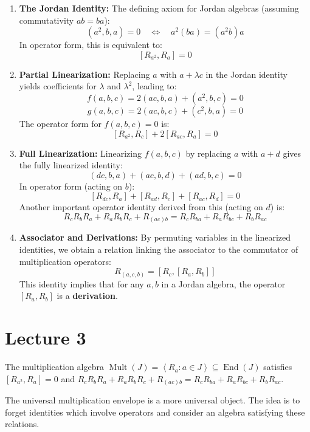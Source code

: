 \documentclass{article}
\def\<{\mathop{\langle}}
\def\>{\mathop{\rangle}}
\begin{document}
\begin{enumerate}
    \item \textbf{The Jordan Identity:}
    The defining axiom for Jordan algebras (assuming commutativity $ab=ba$):
    \[
    (a^2, b, a) = 0 \quad \iff \quad a^2(ba) = (a^2b)a
    \]
    In operator form, this is equivalent to:
    \[
    [R_{a^2}, R_a] = 0 \tag{I}
    \]

    \item \textbf{Partial Linearization:}
    Replacing $a$ with $a + \lambda c$ in the Jordan identity yields coefficients for $\lambda$ and $\lambda^2$, leading to:
    \[
    f(a,b,c) = 2(ac, b, a) + (a^2, b, c) = 0
    \]
    \[
    g(a,b,c) = 2(ac, b, c) + (c^2, b, a) = 0
    \]
    The operator form for $f(a,b,c)=0$ is:
    \[
    [R_{a^2}, R_c] + 2[R_{ac}, R_a] = 0 \tag{II}
    \]

    \item \textbf{Full Linearization:}
    Linearizing $f(a,b,c)$ by replacing $a$ with $a+d$ gives the fully linearized identity:
    \[
    (dc, b, a) + (ac, b, d) + (ad, b, c) = 0
    \]
    In operator form (acting on $b$):
    \[
    [R_{dc}, R_a] + [R_{ad}, R_c] + [R_{ac}, R_d] = 0 \tag{III}
    \]
    Another important operator identity derived from this (acting on $d$) is:
    \[
    R_c R_b R_a + R_a R_b R_c + R_{(ac)b} = R_c R_{ba} + R_a R_{bc} + R_b R_{ac} \tag{**}
    \]

    \item \textbf{Associator and Derivations:}
    By permuting variables in the linearized identities, we obtain a relation linking the associator to the commutator of multiplication operators:
    \[
    R_{(a,c,b)} = [R_c, [R_a, R_b]] \tag{IV}
    \]
    This identity implies that for any $a, b$ in a Jordan algebra, the operator $[R_a, R_b]$ is a \textbf{derivation}.
\end{enumerate}


\section{Lecture 3}

The multiplication algebra $ \operatorname{Mult}(J)=\<R_a: a\in J \> \subseteq \operatorname{End}(J) $ satisfies $ [R_{a^2},R_a] =0$ and $ R_cR_bR_a+R_aR_bR_c+R_{(ac)b}=R_cR_{ba}+R_aR_{bc}+R_bR_{ac} $. 

The universal multiplication envelope is a more universal object. The idea is to forget identities which involve operators and consider an algebra satisfying these relations.  
\end{document}
